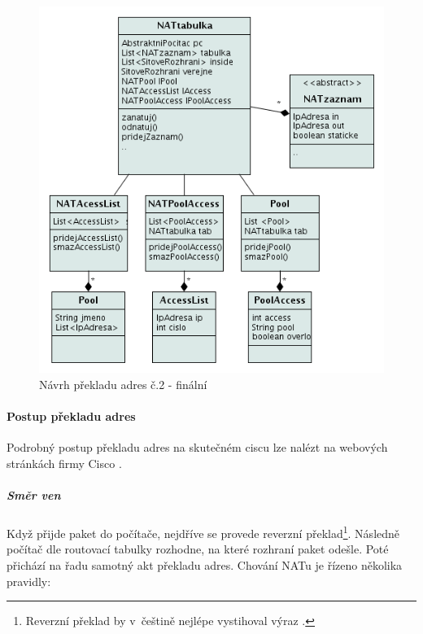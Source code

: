\begin{figure}[b]
\begin{center}
\includegraphics[width=12cm]{figures/nat_navrh2}
\caption{Návrh překladu adres č.2 - finální}
\label{fig:nat_navrh2}
\end{center}
\end{figure}

\paragraph{Postup překladu adres}
Podrobný postup překladu adres na skutečném ciscu lze nalézt na webových stránkách firmy Cisco \cite{cisco:postup}.

\subparagraph{Směr ven}
Když přijde paket do počítače, nejdříve se provede reverzní překlad\footnote{Reverzní překlad by v~češtině nejlépe vystihoval výraz .}. Následně počítač dle routovací tabulky rozhodne, na které rozhraní paket odešle. Poté přichází na řadu samotný akt překladu adres. Chování NATu je řízeno několika pravidly:

